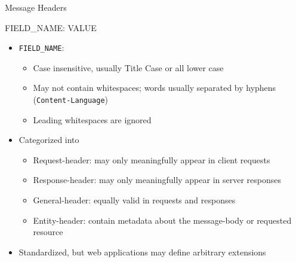 \begin{frame}{Message Headers}
%
\begin{codebox}
\ttfamily
FIELD\_NAME: VALUE
\end{codebox}
%
\begin{itemize}
\item \texttt{FIELD\_NAME}:
	\begin{itemize}
	\item Case insensitive, usually Title Case or all lower case
	\item May not contain whitespaces; words usually separated by hyphens (\zB \texttt{Content-Language})
	\item Leading whitespaces are ignored
	\end{itemize}
\item Categorized into
	\begin{itemize}
	\item Request-header: may only meaningfully appear in client requests
	\item Response-header: may only meaningfully appear in server responses
	\item General-header: equally valid in requests and responses
	\item Entity-header: contain metadata about the message-body or requested resource
	\end{itemize}
\item Standardized, but web applications may define arbitrary extensions
\end{itemize}
%
\end{frame}


